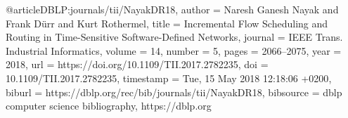 @article{DBLP:journals/tii/NayakDR18,
  author    = {Naresh Ganesh Nayak and
               Frank D{\"{u}}rr and
               Kurt Rothermel},
  title     = {Incremental Flow Scheduling and Routing in Time-Sensitive Software-Defined
               Networks},
  journal   = {{IEEE} Trans. Industrial Informatics},
  volume    = {14},
  number    = {5},
  pages     = {2066--2075},
  year      = {2018},
  url       = {https://doi.org/10.1109/TII.2017.2782235},
  doi       = {10.1109/TII.2017.2782235},
  timestamp = {Tue, 15 May 2018 12:18:06 +0200},
  biburl    = {https://dblp.org/rec/bib/journals/tii/NayakDR18},
  bibsource = {dblp computer science bibliography, https://dblp.org}
}